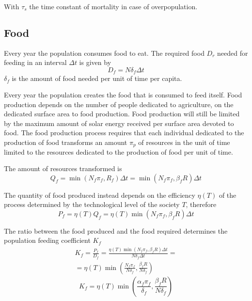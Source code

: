 \documentclass[a4paper,twoside]{article}
\begin{document}
With $ \tau_s $ the time constant of mortality in case of overpopulation.

\subsection{Food}

Every year the population consumes food to eat.
The required food $ D_r $ needed for feeding in an interval $ \Delta t $ is given by
\begin{equation*}
	D_f = N \delta_f \Delta t
\end{equation*}
$ \delta_f $ is the amount of food needed per unit of time per capita.

Every year the population creates the food that is consumed to feed itself.
Food production depends on the number of people dedicated to agriculture, on the dedicated surface area to food production.
Food production will still be limited by the maximum amount of solar energy received per surface area devoted to food.
The food production process requires that each individual dedicated to the production of food transforms an amount $ \pi_p $ of resources in the unit of time limited to the resources dedicated to the production of food per unit of time.

The amount of resources transformed is
\begin{equation*}
	Q_f = \min(N_f \pi_f, R_f) \Delta t
	= \min(N_f \pi_f, \beta_f R) \Delta t
\end{equation*}

The quantity of food produced instead depends on the efficiency $ \eta(T) $ of the process determined by the technological level of the society $ T $, therefore
\begin{equation*}
	P_f = \eta(T) Q_f = \eta(T) \min(N_f \pi_f, \beta_f R) \Delta t
\end{equation*}

The ratio between the food produced and the food required determines the population feeding coefficient $ K_f $
\begin{align*}
	K_f = \frac{P_f}{D_f} = \frac{\eta(T) \min(N_f \pi_f, \beta_f R) \Delta t}{N \delta_f \Delta t} = 
	\\
	= \eta(T) \min \left( \frac{N_f \pi_f}{N \delta_f}, \frac{\beta_f R}{N \delta_f} \right)
\end{align*}
\begin{equation} \label{eq:Kf}
	K_f = \eta(T) \min \left( \frac{\alpha_f \pi_f}{\delta_f}, \frac{\beta_f R}{N \delta_f} \right)
\end{equation}
\end{document}
